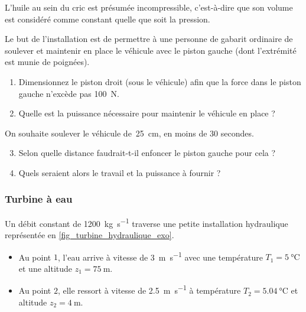 	L’huile au sein du cric est présumée incompressible, c’est-à-dire que son volume est considéré comme constant quelle que soit la pression. 

	Le but de l’installation est de permettre à une personne de gabarit ordinaire de soulever et maintenir en place le véhicule avec le piston gauche (dont l’extrémité est munie de poignées).
	
		\begin{enumerate}
			\item Dimensionnez le piston droit (sous le véhicule) afin que la force dans le piston gauche n’excède pas \SI{100}{\newton}.
			\item Quelle est la puissance nécessaire pour maintenir le véhicule en place ?
		\end{enumerate}
	On souhaite soulever le véhicule de~\SI{25}{\centi\metre}, en moins de 30 secondes.
		\begin{enumerate}
			\setcounter{enumi}{2}
			\item Selon quelle distance faudrait-t-il enfoncer le piston gauche pour cela ?
			\item Quels seraient alors le travail et la puissance à fournir ?
		\end{enumerate}


\subsubsection{Turbine à eau}
\label{exo_turbine_eau_puissances_spe}
	
	Un débit constant de \SI{1200}{\kilogram\per\second} traverse une petite installation hydraulique représentée en \cref{fig_turbine_hydraulique_exo}.
	\begin{itemize}
		\item Au point $1$, l’eau arrive à vitesse de \SI{3}{\metre\per\second} avec une température $T_1 = \SI{5}{\degreeCelsius}$ et une altitude $z_1 = \SI{75}{\metre}$. 
		\item Au point $2$, elle ressort à vitesse de \SI{2,5}{\metre\per\second} à température $T_2 = \SI{5,04}{\degreeCelsius}$ et altitude $z_2 = \SI{4}{\metre}$.
	\end{itemize}

